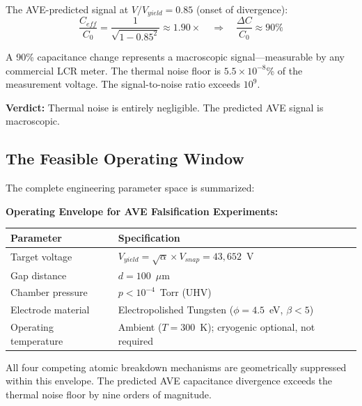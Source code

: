 The AVE-predicted signal at $V/V_{yield} = 0.85$ (onset of divergence):
\begin{equation}
    \frac{C_{eff}}{C_0} = \frac{1}{\sqrt{1 - 0.85^2}} \approx 1.90\times \quad \Longrightarrow \quad \frac{\Delta C}{C_0} \approx 90\%
\end{equation}

A 90\% capacitance change represents a macroscopic signal---measurable by any commercial LCR meter. The thermal noise floor is $5.5 \times 10^{-8}$\% of the measurement voltage. The signal-to-noise ratio exceeds $10^{9}$.

\textbf{Verdict:} Thermal noise is entirely negligible. The predicted AVE signal is macroscopic.

\subsection{The Feasible Operating Window}

The complete engineering parameter space is summarized:

\begin{tcolorbox}[colback=white, colframe=black]
\textbf{Operating Envelope for AVE Falsification Experiments:}
\begin{center}
\renewcommand{\arraystretch}{1.3}
\begin{tabularx}{0.85\textwidth}{@{}lX@{}}
\toprule
\textbf{Parameter} & \textbf{Specification} \\
\midrule
Target voltage        & $V_{yield} = \sqrt{\alpha} \times V_{snap} = 43{,}652$~V \\
Gap distance          & $d = 100$~$\mu$m  \\
Chamber pressure      & $p < 10^{-4}$~Torr (UHV) \\
Electrode material    & Electropolished Tungsten ($\phi = 4.5$~eV, $\beta < 5$)  \\
Operating temperature & Ambient ($T = 300$~K); cryogenic optional, not required \\
\bottomrule
\end{tabularx}
\end{center}
All four competing atomic breakdown mechanisms are geometrically suppressed within this envelope. The predicted AVE capacitance divergence exceeds the thermal noise floor by nine orders of magnitude.
\end{tcolorbox}

